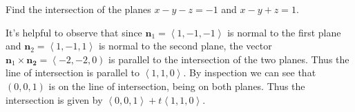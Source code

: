 \documentclass[answers,12pt,addpoints]{exam}
\begin{document}
\begin{questions}
\question[25] Find the intersection of the planes
$x-y-z=-1$ and $x-y+z=1$.
\begin{solution}[1in]
It's helpful to observe that since
$\mathbold{n}_1=\left\langle 1,-1,-1\right\rangle$
is normal to the first plane and
$\mathbold{n}_2=\left\langle 1,-1,1\right\rangle$
is normal to the second plane,
the vector $\mathbold{n}_1\times\mathbold{n_2}
=\left\langle -2,-2,0\right)$ is parallel to the
intersection of the two planes.
Thus the line of intersection is parallel
to $\left\langle 1,1,0\right\rangle$.
By inspection we can see that $\left(0,0,1\right)$
is on the line of intersection, being on both planes.
Thus the intersection is given by
$\left\langle 0,0,1\right\rangle
+t\left\langle 1,1,0\right\rangle$.

\end{solution}

\end{questions}
\end{document}
